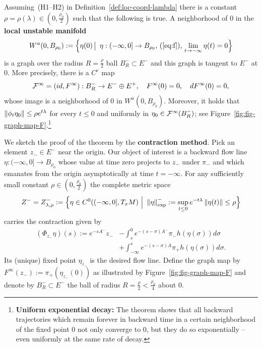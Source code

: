 \documentclass{article}
\begin{document}
\begin{theorem}
\label{thm:loc-unst-mf-thm}
Assuming~(H1--H2) in Definition~\ref{def:loc-coord-lambda}
there is a constant $\rho=\rho(\lambda)\in(0,\frac{\rho_0}{2})$ such that
the following is true. A neighborhood of $0$ in the {\bf local unstable manifold}
\begin{equation}\label{eq:loc-unstab-mf}
     W^u(0,B_{\rho_0})
     :=\Bigl\{\eta(0)\,\big|\,\text{
     $\eta:(-\infty,0]\to B_{\rho_0}$,
     (\ref{eq:f}),
     $\lim_{t\to-\infty} \eta(t)=0$}\Bigr\}
\end{equation}
is a graph over the radius $R=\frac{\rho}{2}$ ball $B^-_R\subset E^-$ and
this graph is tangent to $E^-$ at $0$. More precisely, there is a $C^r$ map
\begin{equation}\label{eq:graph-F}
     \Ff^\infty
     =\left(id,F^\infty\right)
     :B^-_R\to E^-\oplus E^+
     ,\quad
     F^\infty(0)=0
     ,\quad
     dF^\infty(0)=0,
\end{equation}
whose image is a neighborhood of $0$ in $W^u(0,B_{\rho_0})$. Moreover, it holds that
$
     \left\|\phi_t\eta_0\right\|\le \rho e^{t\lambda}
$
for every $t\le 0$ and uniformly in $\eta_0\in{\mathcal{F}}^\infty(B^-_R)$;
see Figure~\ref{fig:fig-graph-map-F}.\footnote{
  {\bf Uniform exponential decay:}
  The theorem shows that all backward trajectories which remain forever in
  backward time in a certain neighborhood of the fixed point $0$ not only
  converge to $0$, but they do so exponentially -- even uniformly at the same rate of decay.
  }
\end{theorem}

We sketch the proof of the theorem by the {\bf contraction method}.
Pick an element $z_-\in E^-$ near the origin. Our object of interest is a backward flow line
$\eta:(-\infty,0]\to B_{\rho_0}$ whose value at time zero
projects to $z_-$ under $\pi_-$ and which emanates from the origin asymptotically at time
$t=-\infty$. For any sufficiently small constant $\rho\in(0,\frac{\rho_0}{2})$ the complete metric space
\begin{equation*}
\begin{split}
     Z^-=Z^-_{\lambda,\rho}
     :=\Bigl\{\eta\in  
     C^0((-\infty,0],T_xM)\,\,\Big|\,\,
     \left\|\eta\right\|_{\exp}^-
     :=\sup_{t\le 0} e^{-t\lambda}
     \left\|\eta(t)\right\|
     \le\rho\Bigr\}
\end{split}
\end{equation*}
carries the contraction given by
\begin{equation}\label{eq:Phi}
\begin{split}
     \left(\Phi_{z_-}\eta\right)(s)
     :=e^{-sA^-} z_-
   &-\int_s^0 e^{-(s-\sigma)A^-}\pi_-
     h(\eta(\sigma)) d\sigma
   \\
   &+\int_{-\infty}^s e^{-(s-\sigma)A}\pi_+
     h(\eta(\sigma)) d\sigma.
\end{split}
\end{equation}
Its (unique) fixed point $\eta_{z_-}$ is the desired flow line. Define the graph map by
$F^\infty(z_-):=\pi_+(\eta_{z_-}(0))$ as illustrated by Figure~\ref{fig:fig-graph-map-F} and denote by
$B^-_R\subset E^-$ the ball of radius $R=\frac{\rho}{2}<\frac{\rho_0}{4}$ about $0$.
\end{document}
